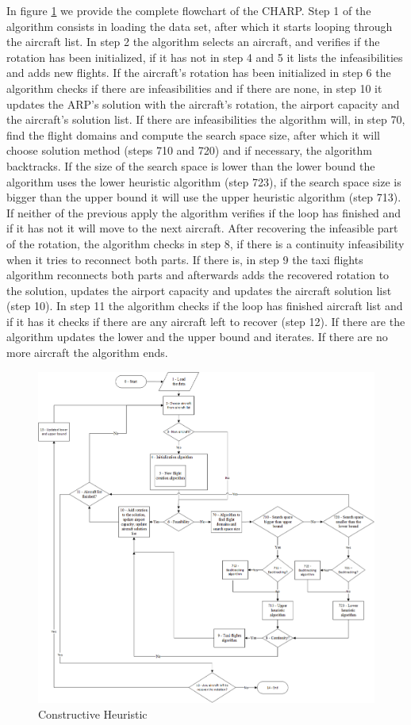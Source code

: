 In figure \ref{fig:mainAlgo} we provide the complete flowchart of the CHARP. Step 1 of the algorithm consists in loading the data set, after which it starts looping through the aircraft list. In step 2 the algorithm selects an aircraft, and verifies if the rotation has been initialized, if it has not in step 4 and 5 it lists the infeasibilities and adds new flights. If the aircraft's rotation has been initialized in step 6 the algorithm checks if there are infeasibilities and if there are none, in step 10 it updates the ARP's solution with the aircraft's rotation, the airport capacity and the aircraft's solution list. If there are infeasibilities the algorithm will, in step 70, find the flight domains and compute the search space size, after which it will choose solution method (steps 710 and 720) and if necessary, the algorithm backtracks.
If the size of the search space is lower than the lower bound the algorithm uses the lower heuristic algorithm (step 723), if the search space size is bigger than the upper bound it will use the upper heuristic algorithm (step 713). If neither of the previous apply the algorithm verifies if the loop has finished and if it has not it will move to the next aircraft. After recovering the infeasible part of the rotation, the algorithm checks in step 8, if there is a continuity infeasibility when it tries to reconnect both parts. If there is, in step 9 the taxi flights algorithm reconnects both parts and afterwards adds the recovered rotation to the solution, updates the airport capacity and updates the aircraft solution list (step 10). In step 11  the algorithm checks if the loop has finished aircraft list and if it has it checks if there are any aircraft left to recover (step 12). If there are the algorithm updates the lower and the upper bound and iterates. If there are no more aircraft the algorithm ends.

 \begin{figure}[h!]
	\centering
	\includegraphics[scale=0.65]{figures/mainAlgo.png}
	\caption[]{Constructive Heuristic}
	\label{fig:mainAlgo}
\end{figure}

%
